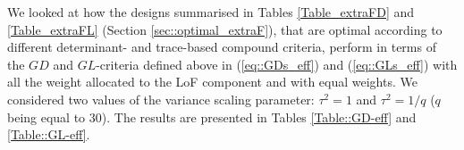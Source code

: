 We looked at how the designs summarised in Tables \ref{Table_extraFD} and \ref{Table_extraFL} (Section \ref{sec::optimal_extraF}), that are optimal according to different determinant- and trace-based compound criteria, perform in terms of the $GD$ and $GL$-criteria defined above in (\ref{eq::GDs_eff}) and (\ref{eq::GLs_eff}) with all the weight allocated to the LoF component and with equal weights. We considered two values of the variance scaling parameter: $\tau^2=1$ and $\tau^2=1/q$ ($q$ being equal to $30$). The results are presented in Tables \ref{Table::GD-eff} and \ref{Table::GL-eff}.

\begin{table}[h]
\begin{center}
\caption{GD-efficiencies of designs optimal in terms of determinant-based compound criteria}
\label{Table::GD-eff}
\end{center}
\end{table}
